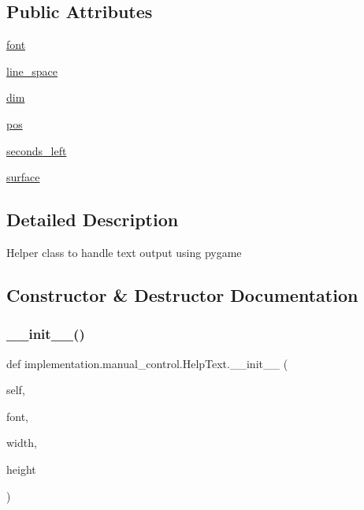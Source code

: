 \subsection*{Public Attributes}
\begin{DoxyCompactItemize}
\item 
\hyperlink{classimplementation_1_1manual__control_1_1_help_text_af4a0194dd1d3b501def507f74fb34c66}{font}
\item 
\hyperlink{classimplementation_1_1manual__control_1_1_help_text_a8953802c95907a76b33501087559f89f}{line\+\_\+space}
\item 
\hyperlink{classimplementation_1_1manual__control_1_1_help_text_ab709d6b17dccf7aa8d72baa89521e5ec}{dim}
\item 
\hyperlink{classimplementation_1_1manual__control_1_1_help_text_a48a3e7d984f55e2ebdb887dad75c06ff}{pos}
\item 
\hyperlink{classimplementation_1_1manual__control_1_1_help_text_a1f58691166a9446ef4e969868806cb7f}{seconds\+\_\+left}
\item 
\hyperlink{classimplementation_1_1manual__control_1_1_help_text_af392ae943c1d955198cbf6f4b6da3f8e}{surface}
\end{DoxyCompactItemize}


\subsection{Detailed Description}
\begin{DoxyVerb}Helper class to handle text output using pygame\end{DoxyVerb}
 

\subsection{Constructor \& Destructor Documentation}
\mbox{\label{classimplementation_1_1manual__control_1_1_help_text_a44a93d3a97a10f0bff24b87d9801df22}} 
\subsubsection{\texorpdfstring{\+\_\+\+\_\+init\+\_\+\+\_\+()}{\_\_init\_\_()}}
{\footnotesize\ttfamily def implementation.\+manual\+\_\+control.\+Help\+Text.\+\_\+\+\_\+init\+\_\+\+\_\+ (\begin{DoxyParamCaption}\item[{}]{self,  }\item[{}]{font,  }\item[{}]{width,  }\item[{}]{height }\end{DoxyParamCaption})}



